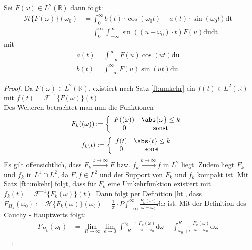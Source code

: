 \begin{lemma}\label{ht:artFou}
Sei $F(\omega) \in L^2(\mathbb{R})$ dann folgt:
\begin{align}
	\mathscr{H}\{F(\omega)\}(\omega_0) &= \int_0^{\infty} b(t) \cdot \cos(\omega_0 t) - a(t) \cdot \sin(\omega_0 t) \mathrm{dt}\\
	&=\int_0^{\infty} \int_{-\infty}^{\infty} \sin((u-\omega_0) \cdot t) F(u) \mathrm{du} \mathrm{dt}  \label{ht:artIntegral1}
\end{align}
mit 
\begin{align}
	a(t) = \int_{-\infty}^{\infty} F(u) \cos(u t) \mathrm{du}\\
	b(t) =  \int_{-\infty}^{\infty} F(u) \sin(u t) \mathrm{du}
\end{align}
\begin{proof}
	Da $F(\omega) \in L^2(\mathbb{R})$, existiert nach Satz \ref{ft:umkehr} ein $f(t) \in L^2(\mathbb{R})$ mit $f(t) = \mathscr{F}^{-1}\{F(\omega)\}(t)$ \\
	Des Weiteren betrachtet man nun die Funktionen 
	\begin{align}
		F_k((\omega)) := \left\{\begin{array}{cc}
		F((\omega)) & \abs{\omega} \leq k \\ 
		0 & \text{ sonst }
		\end{array} \right.
	\end{align}	
	\begin{align}
		f_k(t) := \left\{\begin{array}{cc}
		f(t) & \abs{t} \leq k \\ 
		0 & \text{ sonst }
		\end{array} \right.
	\end{align}	
	Es gilt offensichtlich, dass $F_k \stackrel{k  \rightarrow \infty}{\rightarrow} F$ bzw. $f_k \stackrel{k  \rightarrow \infty}{\rightarrow} f$ in $L^2$ liegt. Zudem liegt $F_k$ und $f_k$ in $L^1 \cap L^2$, da $F, f \in L^2$ und der Support von $F_k$ und $f_k$ kompakt ist. Mit Satz \ref{ft:umkehr} folgt, dass für $F_k$ eine Umkehrfunktion existiert mit $f_k(t) = \mathscr{F}^{-1}\{F_k(\omega)\}(t)$.  Dann folgt per Definition \ref{ht}, dass $F_{H_k}(\omega_0):=\mathscr{H}\{F_k(\omega)\}(\omega_0) = \frac{1}{\pi}\cdot P \int_{-\infty}^{\infty} \frac{F_k(\omega)}{\omega-\omega_0} \mathrm{d\omega}$ ist. Mit der Definition des Cauchy - Hauptwerts folgt:
	\begin{align}
		F_{H_k}(\omega_0) &= \lim_{R \rightarrow \infty}\lim_{\epsilon \rightarrow 0}{\int_{-R}^{\omega_0 - \epsilon} \frac{F_k(\omega)}{\omega - \omega_0} \mathrm{d\omega} +\int_{\omega_0 + \epsilon}^{R} \frac{F_k(\omega)}{\omega - \omega_0} \mathrm{d\omega}} \\

\end{align}
\end{proof}
\end{lemma}
